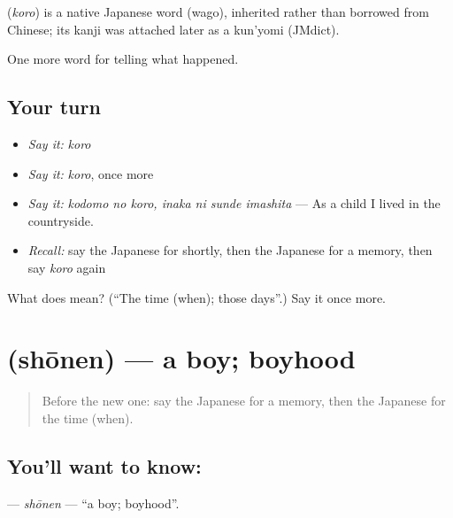 \begin{cousinweb}
\textbf{} (\emph{koro}) is a native Japanese word (wago), inherited rather than borrowed from Chinese; its kanji was attached later as a kun'yomi (JMdict).
\end{cousinweb}

\begin{grammarlens}[title={What you've built}]
One more word for telling what happened.
\end{grammarlens}

\subsection*{Your turn}
\begin{itemize}
\raggedright
  \item \emph{Say it:} \emph{koro}
  \item \emph{Say it:} \emph{koro}, once more
  \item \emph{Say it:} \emph{kodomo no koro, inaka ni sunde imashita} — As a child I lived in the countryside.
  \item \emph{Recall:} say the Japanese for shortly, then the Japanese for a memory, then say \emph{koro} again
\end{itemize}

\begin{tcolorbox}[breakable,colback=teal!4,colframe=teal!35!black,title={Before you move on}]
What does  mean? (\textquotedblleft{}The time (when); those days\textquotedblright{}.) Say it once more.
\end{tcolorbox}
\section[\texorpdfstring{\ja{しょうねん} (shōnen)}{しょうねん (shōnen)}]{ (shōnen) — a boy; boyhood}

\label{lesson:JA-C311-shounen}



\begin{quote}
Before the new one: say the Japanese for a memory, then the Japanese for the time (when).
\end{quote}

\subsection*{You'll want to know: }
\textbf{} — \emph{shōnen} — \textquotedblleft{}a boy; boyhood\textquotedblright{}.

